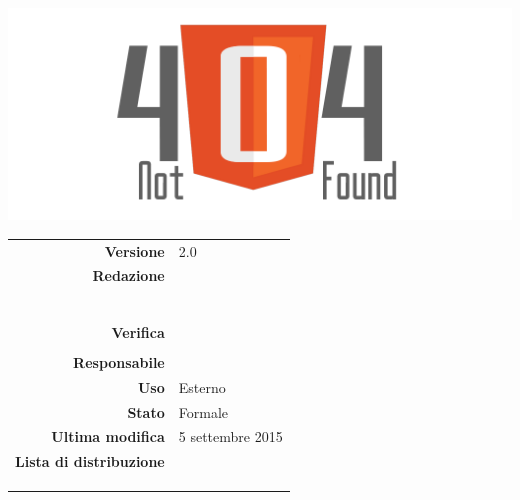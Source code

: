 \thispagestyle{empty}

\begin{titlepage}

	\begin{center}
	\begin{Huge}
		\textbf{\gruppo} \\
	\end{Huge}
	\vspace{0.5cm}
	\begin{Large}
		\textbf{\capitolato}
	\end{Large}
	
	\vspace{1cm}

	\includegraphics[scale=0.35]{../logo/logo404_Extends.png}
	\vspace{1cm}
	\begin{Huge}
		\textbf{\titDoc}
	\end{Huge}
	
	\vspace{1cm}
	
	\begin{table}[h]
	\begin{center}
	\begin{tabular}{r | l}
		\textbf{Versione} & 2.0 \\
		\textbf{Redazione} & \GoIs \\ 
			& \ReAn \\ 
			& \VeFe \\
			& \MaMo \\
			& \DeEn \\
			& \CoMa \\
			& \CaMa \\
		\textbf{Verifica} & \VeFe \\ 
			& \CaMa \\ 
		\textbf{Responsabile} &\CaMa \\
		\textbf{Uso} & Esterno \\
		\textbf{Stato} & Formale \\
		\textbf{Ultima modifica} & 5 settembre 2015 \\
		\textbf{Lista di distribuzione} & \gruppo \\ 
			& \Vardanega \\
			& \Cardin \\
			& \Zucchetti \\
	\end{tabular}
	\end{center}
	\end{table}
	\end{center}
\end{titlepage}